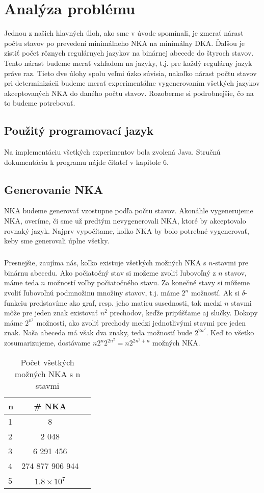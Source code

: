 \chapter{Analýza problému}
Jednou z našich hlavných úloh, ako sme v úvode spomínali, je zmerať nárast počtu stavov po prevedení minimálneho NKA na minimálny DKA. Ďalšou je zistiť počet rôznych regulárnych jazykov na binárnej abecede do štyroch stavov. Tento nárast budeme merať vzhľadom na jazyky, t.j. pre každý regulárny jazyk práve raz. Tieto dve úlohy spolu veľmi úzko súvisia, nakoľko nárast počtu stavov pri determinizácii budeme merať experimentálne vygenerovaním všetkých jazykov akceptovaných NKA do daného počtu stavov. Rozoberme si podrobnejšie, čo na to budeme potrebovať.


\section{Použitý programovací jazyk}
Na implementáciu všetkých experimentov bola zvolená Java. Stručnú dokumentáciu k programu nájde čitateľ v kapitole 6.

\label{genNKA}
\section{Generovanie NKA}
NKA budeme generovať vzostupne podľa počtu stavov. Akonáhle vygenerujeme NKA, overíme, či sme už predtým nevygenerovali NKA, ktoré by akceptovalo rovnaký jazyk. Najprv vypočítame, koľko NKA by bolo potrebné vygenerovať, keby sme generovali úplne všetky.

\paragraph{}
Presnejšie, zaujíma nás, koľko existuje všetkých možných NKA s $n$-stavmi pre binárnu abecedu. Ako počiatočný stav si možeme zvoliť ľubovoľný z $n$ stavov, máme teda $n$ možností voľby počiatočného stavu. Za konečné stavy si môžeme zvoliť ľubovoľnú podmnožinu množiny stavov, t.j. máme $2^n$ možností. Ak si $\delta$-funkciu predstavíme ako graf, resp. jeho maticu susednosti, tak medzi $n$ stavmi môže pre jeden znak existovať $n^2$ prechodov, keďže pripúšťame aj slučky. Dokopy máme $2^{n^2}$ možností, ako zvoliť prechody medzi jednotlivými stavmi pre jeden znak. Naša abeceda má však dva znaky, teda možností bude $2^{2n^2}$. Keď to všetko zosumarizujeme, dostávame $n2^n2^{2n^2} = n2^{2n^2 + n}$ možných NKA.


\begin{table}[h]
  \centering
  \begin{tabular}{|l|c|r|}
    \hline
    n & \# NKA \\
    \hline
    1 & 8 \\ 
    \hline
    2 & 2 048 \\ 
    \hline
    3 & 6 291 456 \\
    \hline
    4 & 274 877 906 944 \\
    \hline
    5 & $1.8 \times 10^7$ \\
    \hline
  \end{tabular}
  \caption{Počet všetkých možných NKA s n stavmi}
  \label{tab:pocVsNKA}
\end{table}
